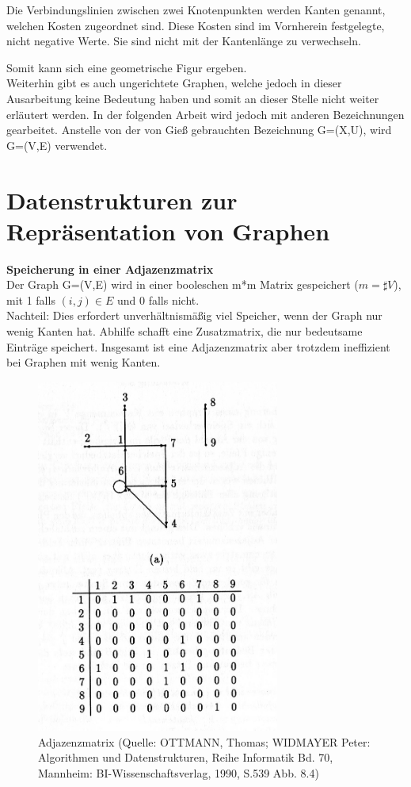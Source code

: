 Die Verbindungslinien zwischen zwei Knotenpunkten werden Kanten genannt, welchen Kosten zugeordnet sind. Diese Kosten sind im Vornherein festgelegte, nicht negative Werte. Sie sind  nicht mit der Kantenlänge zu verwechseln.

Somit kann sich eine geometrische Figur ergeben.\\

Weiterhin gibt es auch ungerichtete Graphen, welche jedoch in dieser Ausarbeitung keine Bedeutung haben und somit an dieser Stelle nicht weiter erläutert werden.
In der folgenden Arbeit wird jedoch mit anderen Bezeichnungen gearbeitet. Anstelle von der von Gieß gebrauchten Bezeichnung G=(X,U), wird G=(V,E) verwendet.



\section{Datenstrukturen zur Repräsentation von Graphen}

\textbf{Speicherung in einer Adjazenzmatrix} \\
Der Graph G=(V,E) wird in einer booleschen m*m Matrix gespeichert ($m = \sharp V$), mit 1 falls $(i,j) \in E$ und 0 falls nicht. \\
Nachteil: Dies erfordert unverhältnismäßig viel Speicher, wenn der Graph nur wenig    	  Kanten hat. Abhilfe schafft eine Zusatzmatrix, die nur bedeutsame Einträge speichert.
 Insgesamt ist eine Adjazenzmatrix aber trotzdem ineffizient bei Graphen mit wenig Kanten. \\
 

\begin{figure}[h]
\centering
\includegraphics[width = 8cm]{./chapters/adjazenzmatrix.jpg}
\caption{Adjazenzmatrix {\tiny (Quelle: OTTMANN, Thomas; WIDMAYER Peter: Algorithmen und Datenstrukturen, Reihe Informatik Bd. 70, Mannheim: BI-Wissenschaftsverlag, 1990, S.539 Abb. 8.4)} }
\label{a2}
\end{figure}
 

